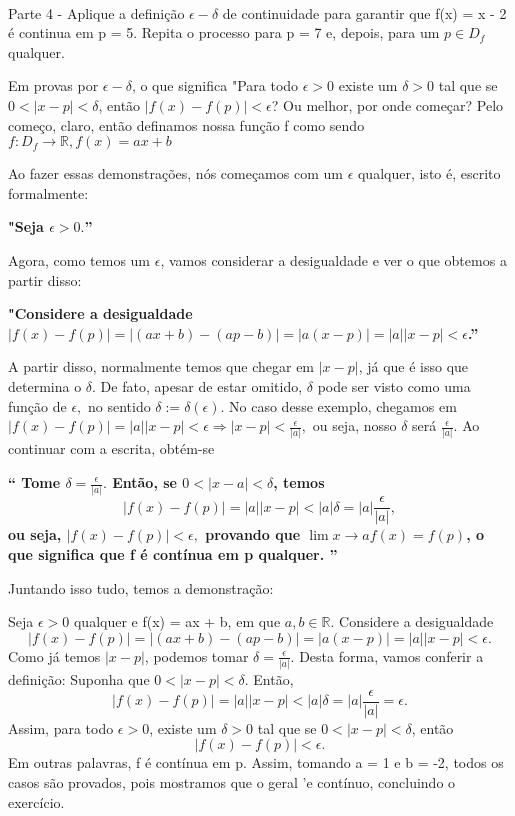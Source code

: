\documentclass[exercícios_de_cálculo.tex]{subfiles}
\begin{document}
\paragraph{} Parte 4 - Aplique a definição $\epsilon-\delta$ de continuidade para garantir que f(x) = x - 2 é continua em p = 5. Repita o processo para p = 7 e, depois, para um $p\in{D_f}$ qualquer.
\begin{proof*}
	Em provas por $\epsilon-\delta$, o que significa "Para todo $\epsilon > 0$ existe um $\delta > 0$ tal que se $0 < |x - p| < \delta$, então $|f(x) - f(p)| < \epsilon$? Ou melhor, por onde começar? Pelo começo, claro, então definamos nossa funç\~ao f como sendo $f:D_f\rightarrow\mathbb{R}, f(x) = ax + b$

	Ao fazer essas demonstrações, nós começamos com um $\epsilon$ qualquer, isto é, escrito formalmente:

	\textbf{"Seja $\epsilon > 0.$''}

	Agora, como temos um $\epsilon$, vamos considerar a desigualdade e ver o que obtemos a partir disso:

	\textbf{"Considere a desigualdade $|f(x) - f(p)| = |(ax + b) - (ap - b)| = |a(x - p)| = |a||x - p|< \epsilon$.'' }

	A partir disso, normalmente temos que chegar em $|x - p|$, já que é isso que determina o $\delta.$ De fato, apesar de estar omitido, $\delta$ pode ser visto como uma função de $\epsilon,$ no sentido $\delta := \delta(\epsilon).$
	No caso desse exemplo, chegamos em $|f(x) - f(p)| = |a||x - p| < \epsilon \Rightarrow |x - p| < \frac{\epsilon}{|a|},$ ou seja, nosso $\delta$ será $\frac{\epsilon}{|a|}$. Ao continuar com a escrita, obtém-se

	\textbf{``
		Tome $\delta = \frac{\epsilon}{|a|}.$ Então, se $0 < |x - a| < \delta$, temos
		$$
			|f(x) - f(p)| = |a||x - p| < |a|\delta = |a|\frac{\epsilon}{|a|},
		$$
		ou seja, $|f(x) - f(p)| < \epsilon,$ provando que $\lim{x\to{a}} f(x) = f(p)$, o que significa que f é contínua em p qualquer.
		''}

	Juntando isso tudo, temos a demonstração:

	Seja $\epsilon > 0$ qualquer e f(x) = ax + b, em que $a, b\in\mathbb{R}$. Considere a desigualdade
	$$
		|f(x) - f(p)| = |(ax + b) - (ap - b)| = |a(x - p)| = |a||x - p|< \epsilon.
	$$
	Como já temos $|x - p|$, podemos tomar $\delta = \frac{\epsilon}{|a|}.$ Desta forma, vamos conferir a definição: Suponha que $0 < |x - p| < \delta.$ Então,
	$$
		|f(x) - f(p)| = |a||x - p| < |a|\delta = |a|\frac{\epsilon}{|a|} = \epsilon.
	$$
	Assim, para todo $\epsilon > 0$, existe um $\delta > 0$ tal que se $0 < |x - p| < \delta$, então
	$$
		|f(x) - f(p)| < \epsilon.
	$$
	Em outras palavras, f é contínua em p. Assim, tomando a = 1 e b = -2, todos os casos são provados, pois mostramos que o geral 'e cont\'inuo, concluindo o exerc\'icio.
	\qedsymbol
\end{proof*}
\end{document}
